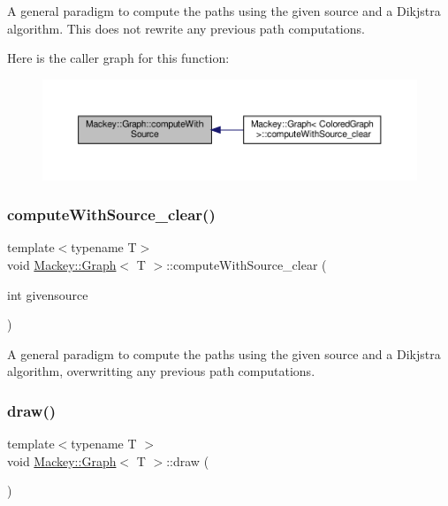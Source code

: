 A general paradigm to compute the paths using the given source and a Dikjstra algorithm. This does not rewrite any previous path computations. 

Here is the caller graph for this function\+:\nopagebreak
\begin{figure}[H]
\begin{center}
\leavevmode
\includegraphics[width=350pt]{classMackey_1_1Graph_acda32cd8d144dcd1ec771bd8d2753321_icgraph}
\end{center}
\end{figure}
\mbox{\label{classMackey_1_1Graph_a769966fd9422efb15a53db185a8be278}} 
\subsubsection{\texorpdfstring{compute\+With\+Source\+\_\+clear()}{computeWithSource\_clear()}}
{\footnotesize\ttfamily template$<$typename T$>$ \\
void \hyperlink{classMackey_1_1Graph}{Mackey\+::\+Graph}$<$ T $>$\+::compute\+With\+Source\+\_\+clear (\begin{DoxyParamCaption}\item[{int}]{givensource }\end{DoxyParamCaption})\hspace{0.3cm}{\ttfamily [inline]}}



A general paradigm to compute the paths using the given source and a Dikjstra algorithm, overwritting any previous path computations. 

\mbox{\label{classMackey_1_1Graph_ab88d38f2fa1822d415ce7dac272b32dc}} 
\subsubsection{\texorpdfstring{draw()}{draw()}\hspace{0.1cm}{\footnotesize\ttfamily [1/2]}}
{\footnotesize\ttfamily template$<$typename T $>$ \\
void \hyperlink{classMackey_1_1Graph}{Mackey\+::\+Graph}$<$ T $>$\+::draw (\begin{DoxyParamCaption}{ }\end{DoxyParamCaption})}



